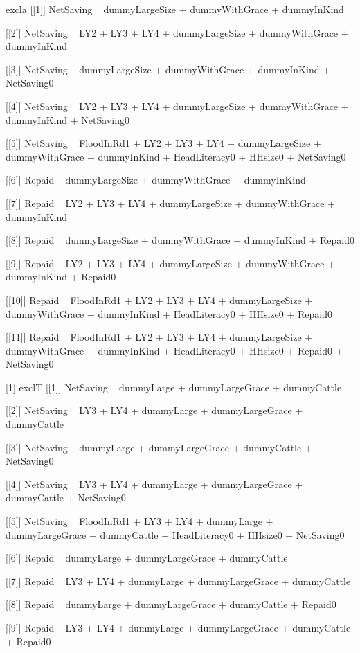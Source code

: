 \begin{Schunk}
\begin{Soutput}
[1] excla
[[1]]
NetSaving ~ dummyLargeSize + dummyWithGrace + dummyInKind

[[2]]
NetSaving ~ LY2 + LY3 + LY4 + dummyLargeSize + dummyWithGrace + 
    dummyInKind

[[3]]
NetSaving ~ dummyLargeSize + dummyWithGrace + dummyInKind + NetSaving0

[[4]]
NetSaving ~ LY2 + LY3 + LY4 + dummyLargeSize + dummyWithGrace + 
    dummyInKind + NetSaving0

[[5]]
NetSaving ~ FloodInRd1 + LY2 + LY3 + LY4 + dummyLargeSize + dummyWithGrace + 
    dummyInKind + HeadLiteracy0 + HHsize0 + NetSaving0

[[6]]
Repaid ~ dummyLargeSize + dummyWithGrace + dummyInKind

[[7]]
Repaid ~ LY2 + LY3 + LY4 + dummyLargeSize + dummyWithGrace + 
    dummyInKind

[[8]]
Repaid ~ dummyLargeSize + dummyWithGrace + dummyInKind + Repaid0

[[9]]
Repaid ~ LY2 + LY3 + LY4 + dummyLargeSize + dummyWithGrace + 
    dummyInKind + Repaid0

[[10]]
Repaid ~ FloodInRd1 + LY2 + LY3 + LY4 + dummyLargeSize + dummyWithGrace + 
    dummyInKind + HeadLiteracy0 + HHsize0 + Repaid0

[[11]]
Repaid ~ FloodInRd1 + LY2 + LY3 + LY4 + dummyLargeSize + dummyWithGrace + 
    dummyInKind + HeadLiteracy0 + HHsize0 + Repaid0 + NetSaving0

[1] exclT
[[1]]
NetSaving ~ dummyLarge + dummyLargeGrace + dummyCattle

[[2]]
NetSaving ~ LY3 + LY4 + dummyLarge + dummyLargeGrace + dummyCattle

[[3]]
NetSaving ~ dummyLarge + dummyLargeGrace + dummyCattle + NetSaving0

[[4]]
NetSaving ~ LY3 + LY4 + dummyLarge + dummyLargeGrace + dummyCattle + 
    NetSaving0

[[5]]
NetSaving ~ FloodInRd1 + LY3 + LY4 + dummyLarge + dummyLargeGrace + 
    dummyCattle + HeadLiteracy0 + HHsize0 + NetSaving0

[[6]]
Repaid ~ dummyLarge + dummyLargeGrace + dummyCattle

[[7]]
Repaid ~ LY3 + LY4 + dummyLarge + dummyLargeGrace + dummyCattle

[[8]]
Repaid ~ dummyLarge + dummyLargeGrace + dummyCattle + Repaid0

[[9]]
Repaid ~ LY3 + LY4 + dummyLarge + dummyLargeGrace + dummyCattle + 
    Repaid0


\end{Soutput}
\end{Schunk}
